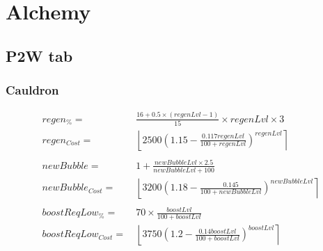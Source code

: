 \chapter{Alchemy}
    \section{P2W tab}
        \subsection{Cauldron}
            \begin{align*}
                regen_\% = &\ \frac{16 + 0.5 \times (regenLvl-1)}{15} \times regenLvl \times 3
                \\ 
                regen_{Cost} = &\ 
                    \left\lfloor 
                        2500\left(1.15-\frac{0.117regenLvl}{100+regenLvl}\right)^{regenLvl}
                    \right\rceil 
                \\ 
                \\
                newBubble = &\ 1 + \frac{newBubbleLvl \times 2.5}{newBubbleLvl + 100}
                \\
                newBubble_{Cost} = &\ 
                    \left\lfloor 
                        3200\left(1.18-\frac{0.145}{100+newBubbleLvl}\right)^{newBubbleLvl}
                    \right\rceil 
                \\
                \\
                boostReqLow_\% = &\ 70 \times \frac{boostLvl}{100+boostLvl}
                \\
                boostReqLow_{Cost} = &\ 
                    \left\lfloor 
                        3750\left(1.2-\frac{0.14boostLvl}{100+boostLvl}\right)^{boostLvl}
                    \right\rceil 
            \end{align*}
        
        \newpage
